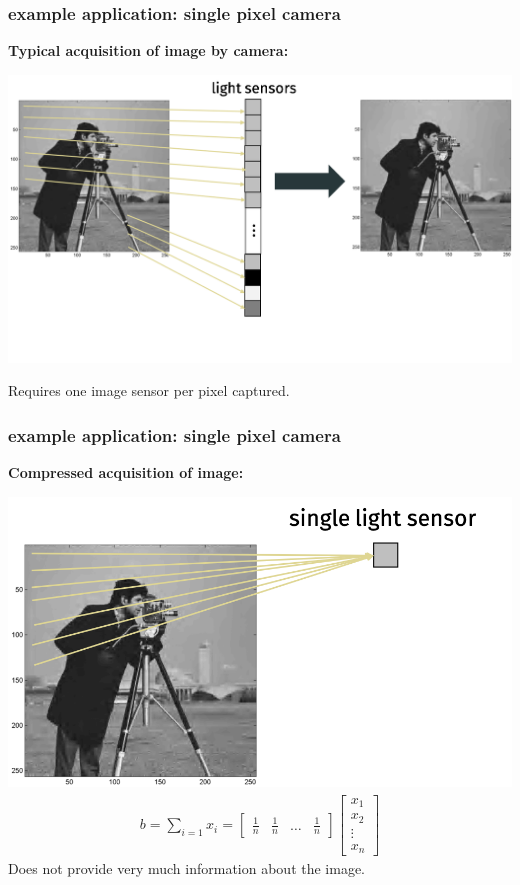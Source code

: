 \documentclass[compress]{beamer}
\begin{document}
\begin{frame}
	\frametitle{example application: single pixel camera}
	\textbf{Typical acquisition of image by camera:}
	\begin{center}
		\includegraphics[width=.8\textwidth]{typicalCamera.png}
		
		Requires one image sensor per pixel captured.
	\end{center}
\end{frame}

\begin{frame}
	\frametitle{example application: single pixel camera}
	\textbf{Compressed acquisition of image:}
	\begin{center}
		\includegraphics[width=.6\textwidth]{singlePixelCamera.png}
		\begin{align*}
			b = \sum_{i=1}x_i  = \begin{bmatrix}\frac{1}{n} &\frac{1}{n} &\ldots& \frac{1}{n}\end{bmatrix}\begin{bmatrix}x_1 \\x_2 \\\vdots\\ x_n\end{bmatrix}
		\end{align*}
		Does not provide very much information about the image. 
	\end{center}
\end{frame}
\end{document}
